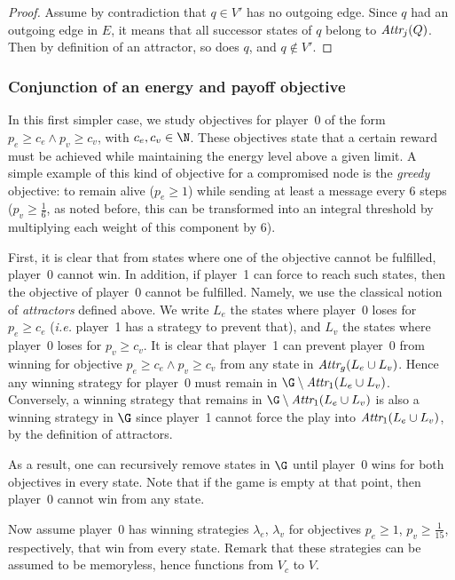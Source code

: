 \begin{proof}
Assume by contradiction that $q \in V'$ has no outgoing edge.
Since $q$ had an outgoing edge in $E$, it means that all successor states of $q$ belong to $\textit{Attr}_{j}(Q)$.
Then by definition of an attractor, so does $q$, and $q \notin V'$.
\end{proof}

\subsubsection{Conjunction of an energy and payoff objective}

In this first simpler case, we study objectives for player~0 of the form $p_e \geq c_e \wedge p_v \geq c_v$, with $c_e,c_v \in \N$.
These objectives state that a certain reward must be achieved while maintaining the energy level above a given limit.
A simple example of this kind of objective for a compromised node is the \emph{greedy} objective: to remain alive ($p_e \geq 1$) while sending at least a message every $6$ steps ($p_v \geq \frac1{6}$, as noted before, this can be transformed into an integral threshold by multiplying each weight of this component by $6$).

First, it is clear that from states where one of the objective cannot be fulfilled, player~0 cannot win.
In addition, if player~1 can force to reach such states, then the objective of player~0 cannot be fulfilled.
Namely, we use the classical notion of \emph{attractors} defined above.
We write $L_e$ the states where player~0 loses for $p_e \geq c_e$ (\emph{i.e.} player~1 has a strategy to prevent that), and $L_v$ the states where player~0 loses for $p_v \geq c_v$.
It is clear that player~1 can prevent player~0 from winning for objective $p_e \geq c_e \wedge p_v \geq c_v$ from any state in $\textit{Attr}_{g}(L_e \cup L_v)$.
Hence any winning strategy for player~0 must remain in $\G \setminus\attractor{1}(L_e \cup L_v)$.
Conversely, a winning strategy that remains in $\G \setminus\attractor{1}(L_e \cup L_v)$ is also a winning strategy in $\G$ since player~1 cannot force the play into $\textit{Attr}_{1}(L_e \cup L_v)$, by the definition of attractors.

As a result, one can recursively remove states in $\G$ until player~0 wins for both objectives in every state.
Note that if the game is empty at that point, then player~0 cannot win from any state.

Now assume player~0 has winning strategies $\lambda_e$, $\lambda_v$ for objectives $p_e \geq 1$, $p_v \geq \frac1{15}$, respectively, that win from every state.
Remark that these strategies can be assumed to be memoryless, hence functions from $V_c$ to $V$.

